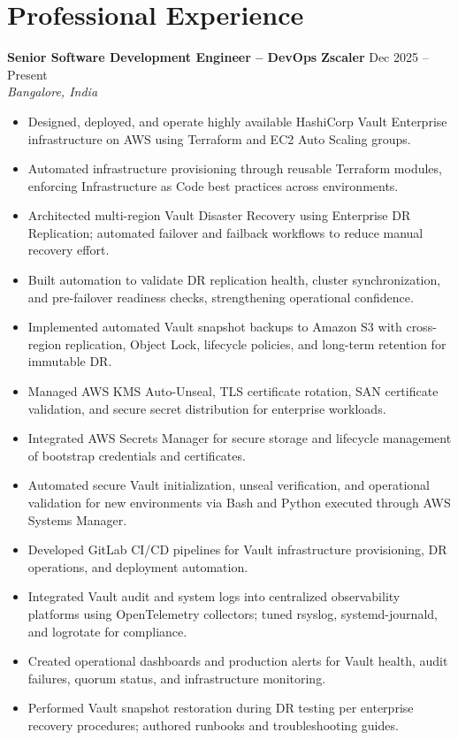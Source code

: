 \documentclass[letterpaper,10.5pt]{article}
\newcommand{\role}[4]{%
  \noindent\textbf{#1} \textbar{} \textbf{#2} \hfill #3\\
  \textit{#4}\vspace{2pt}
}
\begin{document}
\section*{Professional Experience}

\role{Senior Software Development Engineer -- DevOps}{Zscaler}{Dec 2025 -- Present}{Bangalore, India}
\begin{itemize}
    \item Designed, deployed, and operate highly available HashiCorp Vault Enterprise infrastructure on AWS using Terraform and EC2 Auto Scaling groups.
    \item Automated infrastructure provisioning through reusable Terraform modules, enforcing Infrastructure as Code best practices across environments.
    \item Architected multi-region Vault Disaster Recovery using Enterprise DR Replication; automated failover and failback workflows to reduce manual recovery effort.
    \item Built automation to validate DR replication health, cluster synchronization, and pre-failover readiness checks, strengthening operational confidence.
    \item Implemented automated Vault snapshot backups to Amazon S3 with cross-region replication, Object Lock, lifecycle policies, and long-term retention for immutable DR.
    \item Managed AWS KMS Auto-Unseal, TLS certificate rotation, SAN certificate validation, and secure secret distribution for enterprise workloads.
    \item Integrated AWS Secrets Manager for secure storage and lifecycle management of bootstrap credentials and certificates.
    \item Automated secure Vault initialization, unseal verification, and operational validation for new environments via Bash and Python executed through AWS Systems Manager.
    \item Developed GitLab CI/CD pipelines for Vault infrastructure provisioning, DR operations, and deployment automation.
    \item Integrated Vault audit and system logs into centralized observability platforms using OpenTelemetry collectors; tuned rsyslog, systemd-journald, and logrotate for compliance.
    \item Created operational dashboards and production alerts for Vault health, audit failures, quorum status, and infrastructure monitoring.
    \item Performed Vault snapshot restoration during DR testing per enterprise recovery procedures; authored runbooks and troubleshooting guides.
    \vspace{12pt}
\end{itemize}
\end{document}
